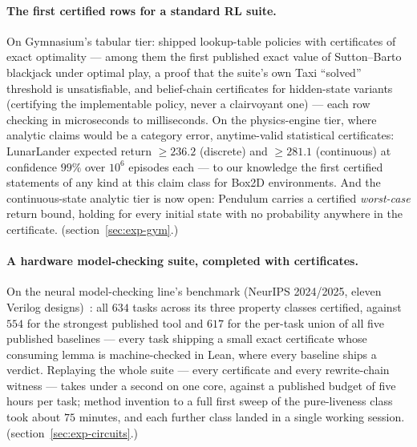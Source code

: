 \paragraph{The first certified rows for a standard RL suite.} On
Gymnasium's tabular tier: shipped lookup-table policies with
certificates of exact optimality --- among them the first published
exact value of Sutton--Barto blackjack under optimal play, a proof
that the suite's own Taxi ``solved'' threshold is unsatisfiable, and
belief-chain certificates for hidden-state variants (certifying the
implementable policy, never a clairvoyant one) --- each row checking
in microseconds to milliseconds. On the physics-engine tier, where
analytic claims would be a category error, anytime-valid statistical
certificates: LunarLander expected return $\ge 236.2$ (discrete) and
$\ge 281.1$ (continuous) at confidence $99\%$ over $10^6$ episodes
each --- to our knowledge the first certified statements of any kind
at this claim class for Box2D environments. And the continuous-state
analytic tier is now open: Pendulum carries a certified
\emph{worst-case} return bound, holding for every initial state with
no probability anywhere in the certificate.
(section~\ref{sec:exp-gym}.)

\paragraph{A hardware model-checking suite, completed with
certificates.} On the neural model-checking line's benchmark
(NeurIPS 2024/2025, eleven Verilog
designs)~\cite{giacobbe24,neuralmc-2025-invariant}: all $634$ tasks across
its three property classes certified, against $554$ for the
strongest published tool and $617$ for the per-task union of all
five published baselines --- every task shipping a small exact
certificate whose consuming lemma is machine-checked in Lean, where
every baseline ships a verdict. Replaying the whole suite --- every
certificate and every rewrite-chain witness --- takes under a second
on one core, against a published budget of five hours per task;
method invention to a full first sweep of the pure-liveness class
took about $75$ minutes, and each further class landed in a single
working session. (section~\ref{sec:exp-circuits}.)

